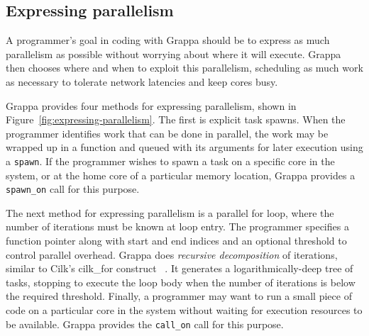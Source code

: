 \subsection{Expressing parallelism}

A programmer's goal in coding with Grappa should be to express as much
parallelism as possible without worrying about where it will execute.
Grappa then chooses where and when to exploit this parallelism,
scheduling as much work as necessary to tolerate network latencies and
keep cores busy. 

Grappa provides four methods for expressing parallelism, shown in
Figure~\ref{fig:expressing-parallelism}. The first is explicit task
spawns. When the programmer identifies work that can be done in
parallel, the work may be wrapped up in a function and queued with its
arguments for later execution using a \texttt{spawn}. If the
programmer wishes to spawn a task on a specific core in the system,
or at the home core of a particular memory location, Grappa provides a
\texttt{spawn\_on} call for this purpose.

The next method for expressing parallelism is a parallel for loop, where
the number of iterations must be known at loop entry. The programmer
specifies a function pointer along with start and end indices and an
optional threshold to control parallel overhead. Grappa does {\em
recursive decomposition} of iterations, similar to Cilk's cilk\_for
construct~\cite {cilkforimplementation} .  It generates a
logarithmically-deep tree of tasks, stopping to execute the loop body
when the number of iterations is below the required threshold. Finally,
a programmer may want to run a small piece of code on a particular core
in the system without waiting for execution resources to be available.
Grappa provides the \texttt{call\_on} call for this purpose.

